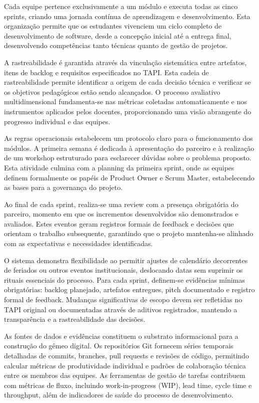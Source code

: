 \documentclass[12pt,a4paper]{article}
\begin{document}
Cada equipe pertence exclusivamente a um módulo e executa todas as cinco sprints, criando uma jornada contínua de aprendizagem e desenvolvimento. Esta organização permite que os estudantes vivenciem um ciclo completo de desenvolvimento de software, desde a concepção inicial até a entrega final, desenvolvendo competências tanto técnicas quanto de gestão de projetos.

A rastreabilidade é garantida através da vinculação sistemática entre artefatos, itens de backlog e requisitos especificados no TAPI. Esta cadeia de rastreabilidade permite identificar a origem de cada decisão técnica e verificar se os objetivos pedagógicos estão sendo alcançados. O processo avaliativo multidimensional fundamenta-se nas métricas coletadas automaticamente e nos instrumentos aplicados pelos docentes, proporcionando uma visão abrangente do progresso individual e das equipes.

As regras operacionais estabelecem um protocolo claro para o funcionamento dos módulos. A primeira semana é dedicada à apresentação do parceiro e à realização de um workshop estruturado para esclarecer dúvidas sobre o problema proposto. Esta atividade culmina com a planning da primeira sprint, onde as equipes definem formalmente os papéis de Product Owner e Scrum Master, estabelecendo as bases para a governança do projeto.

Ao final de cada sprint, realiza-se uma review com a presença obrigatória do parceiro, momento em que os incrementos desenvolvidos são demonstrados e avaliados. Estes eventos geram registros formais de feedback e decisões que orientam o trabalho subsequente, garantindo que o projeto mantenha-se alinhado com as expectativas e necessidades identificadas.

O sistema demonstra flexibilidade ao permitir ajustes de calendário decorrentes de feriados ou outros eventos institucionais, deslocando datas sem suprimir os rituais essenciais do processo. Para cada sprint, definem-se evidências mínimas obrigatórias: backlog planejado, artefatos entregues, pitch documentado e registro formal de feedback. Mudanças significativas de escopo devem ser refletidas no TAPI original ou documentadas através de aditivos registrados, mantendo a transparência e a rastreabilidade das decisões.

As fontes de dados e evidências constituem o substrato informacional para a construção do gêmeo digital. Os repositórios Git fornecem séries temporais detalhadas de commits, branches, pull requests e revisões de código, permitindo calcular métricas de produtividade individual e padrões de colaboração técnica entre os membros das equipes. As ferramentas de gestão de tarefas contribuem com métricas de fluxo, incluindo work-in-progress (WIP), lead time, cycle time e throughput, além de indicadores de saúde do processo de desenvolvimento.
\end{document}
